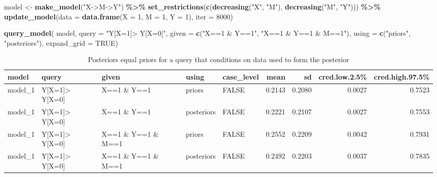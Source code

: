 \documentclass[
  12pt,
]{book}
\newenvironment{Shaded}{\begin{snugshade}}{\end{snugshade}}
\newcommand{\AttributeTok}[1]{\textcolor[rgb]{0.13,0.29,0.53}{#1}}
\newcommand{\ConstantTok}[1]{\textcolor[rgb]{0.56,0.35,0.01}{#1}}
\newcommand{\DecValTok}[1]{\textcolor[rgb]{0.00,0.00,0.81}{#1}}
\newcommand{\FunctionTok}[1]{\textcolor[rgb]{0.13,0.29,0.53}{\textbf{#1}}}
\newcommand{\NormalTok}[1]{#1}
\newcommand{\OtherTok}[1]{\textcolor[rgb]{0.56,0.35,0.01}{#1}}
\newcommand{\SpecialCharTok}[1]{\textcolor[rgb]{0.81,0.36,0.00}{\textbf{#1}}}
\newcommand{\StringTok}[1]{\textcolor[rgb]{0.31,0.60,0.02}{#1}}
\begin{document}
\begin{Shaded}
\begin{Highlighting}[]
\NormalTok{model }\OtherTok{\textless{}{-}} \FunctionTok{make\_model}\NormalTok{(}\StringTok{"X{-}\textgreater{}M{-}\textgreater{}Y"}\NormalTok{) }\SpecialCharTok{\%\textgreater{}\%} 
  \FunctionTok{set\_restrictions}\NormalTok{(}\FunctionTok{c}\NormalTok{(}\FunctionTok{decreasing}\NormalTok{(}\StringTok{"X"}\NormalTok{, }\StringTok{"M"}\NormalTok{), }\FunctionTok{decreasing}\NormalTok{(}\StringTok{"M"}\NormalTok{, }\StringTok{"Y"}\NormalTok{))) }\SpecialCharTok{\%\textgreater{}\%}
  \FunctionTok{update\_model}\NormalTok{(}\AttributeTok{data =} \FunctionTok{data.frame}\NormalTok{(}\AttributeTok{X =} \DecValTok{1}\NormalTok{, }\AttributeTok{M =} \DecValTok{1}\NormalTok{, }\AttributeTok{Y =} \DecValTok{1}\NormalTok{), }\AttributeTok{iter =} \DecValTok{8000}\NormalTok{)}

\FunctionTok{query\_model}\NormalTok{(}
\NormalTok{            model, }
            \AttributeTok{query =} \StringTok{"Y[X=1]\textgreater{} Y[X=0]"}\NormalTok{,}
            \AttributeTok{given =} \FunctionTok{c}\NormalTok{(}\StringTok{"X==1 \& Y==1"}\NormalTok{, }\StringTok{"X==1 \& Y==1 \& M==1"}\NormalTok{),}
            \AttributeTok{using =} \FunctionTok{c}\NormalTok{(}\StringTok{"priors"}\NormalTok{, }\StringTok{"posteriors"}\NormalTok{),}
            \AttributeTok{expand\_grid =} \ConstantTok{TRUE}\NormalTok{)}
\end{Highlighting}
\end{Shaded}

\begin{table}

\caption{\label{tab:unnamed-chunk-48}Posteriors equal priors for a query that conditions on data used to form the posterior }
\centering
\begin{tabular}[t]{l|l|l|l|l|r|r|r|r}
\hline
model & query & given & using & case\_level & mean & sd & cred.low.2.5\% & cred.high.97.5\%\\
\hline
model\_1 & Y[X=1]> Y[X=0] & X==1 \& Y==1 & priors & FALSE & 0.2143 & 0.2080 & 0.0027 & 0.7523\\
\hline
model\_1 & Y[X=1]> Y[X=0] & X==1 \& Y==1 & posteriors & FALSE & 0.2221 & 0.2107 & 0.0027 & 0.7553\\
\hline
model\_1 & Y[X=1]> Y[X=0] & X==1 \& Y==1 \& M==1 & priors & FALSE & 0.2552 & 0.2209 & 0.0042 & 0.7931\\
\hline
model\_1 & Y[X=1]> Y[X=0] & X==1 \& Y==1 \& M==1 & posteriors & FALSE & 0.2492 & 0.2203 & 0.0037 & 0.7835\\
\hline
\end{tabular}
\end{table}
\end{document}

